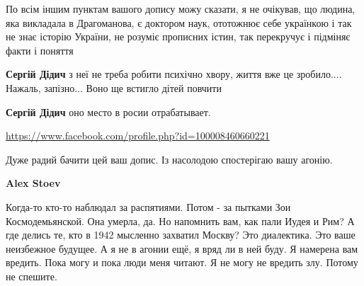 \begin{itemize}
По всім іншим пунктам вашого допису можу сказати, я не очікував, що людина, яка
викладала в Драгоманова, є доктором наук, ототожнює себе українкою і так не
знає історію України, не розуміє прописних істин, так перекручує і підміняє
факти і поняття

\begin{itemize}
 
\textbf{Сергій Дідич} з неї не треба робити психічно хвору, життя вже це зробило.... Нажаль, запізно... Воно ще встигло дітей повчити

 
\textbf{Сергій Дідич} оно место в росии отрабатывает.
\end{itemize}

\url{https://www.facebook.com/profile.php?id=100008460660221}\par
 
Дуже радий бачити цей ваш допис. Із насолодою спостерігаю вашу агонію.

\begin{itemize}
 
\textbf{Alex Stoev} 

Когда-то кто-то наблюдал за распятиями. Потом - за пытками Зои Космодемьянской.
Она умерла, да. Но напомнить вам, как пали Иудея и Рим? А где делись те, кто в
1942 мысленно захватил Москву? Это диалектика. Это ваше неизбежное будущее. А я
не в агонии ещё, я вряд ли в ней буду. Я намерена вам вредить. Пока могу и пока
люди меня читают. Я не могу не вредить злу. Потому не спешите.



\end{itemize}
\end{itemize}
